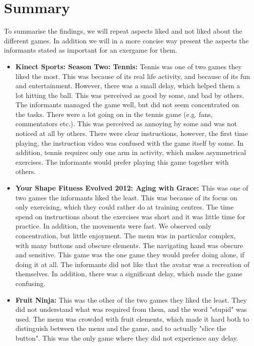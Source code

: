 \section{Summary}
To summarise the findings, we will repeat aspects liked and not liked about the different games. In addition we will in a more concise way present the aspects the informants stated as important for an exergame for them. 

\begin{itemize}
\item \textbf{Kinect Sports: Season Two: Tennis:} Tennis was one of two games they liked the most. This was because of its real life activity, and because of its fun and entertainment. However, there was a small delay, which helped them a lot hitting the ball. This was perceived as good by some, and bad by others. The informants managed the game well, but did not seem concentrated on the tasks. There were a lot going on in the tennis game (e.g. fans, commentators etc.). This was perceived as annoying by some and was not noticed at all by others. There were clear instructions, however, the first time playing, the instruction video was confused with the game itself by some. In addition, tennis requires only one arm in activity, which makes asymmetrical exercises. The informants would prefer playing this game together with others. 

\item \textbf{Your Shape Fitness Evolved 2012: Aging with Grace:} This was one of two games the informants liked the least. This was because of its focus on only exercising, which they could rather do at training centres.  The time spend on instructions about the exercises was short and it was little time for practice. In addition, the movements were fast.  We observed only concentration, but little enjoyment. The menu was in particular complex, with many buttons and obscure elements. The navigating hand was obscure and sensitive. This game was the one game they would prefer doing alone, if doing it at all. The informants did not like that the avatar was a recreation of themselves. In addition, there was a significant delay, which made the game confusing.

\item \textbf{Fruit Ninja:} This was the other of the two games they liked the least.  They did not understand what was required from them, and the word "stupid" was used. The menu was crowded with fruit elements, which made it hard both to distinguish between the menu and the game, and to actually "slice the button". This was the only game where they did not experience any delay.


\end{itemize}
